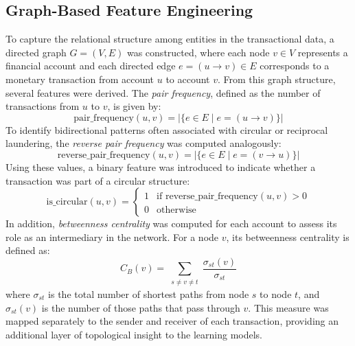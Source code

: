 \documentclass[a4paper]{article}
\begin{document}
\subsection{Graph-Based Feature Engineering}
To capture the relational structure among entities in the transactional data, a directed graph \( G = (V, E) \) was constructed, where each node \( v \in V \) represents a financial account and each directed edge \( e = (u \rightarrow v) \in E \) corresponds to a monetary transaction from account \( u \) to account \( v \).
From this graph structure, several features were derived. The \textit{pair frequency}, defined as the number of transactions from \( u \) to \( v \), is given by:
\begin{equation}
\text{pair\_frequency}(u, v) = |\{ e \in E \mid e = (u \rightarrow v) \}|
\end{equation}
To identify bidirectional patterns often associated with circular or reciprocal laundering, the \textit{reverse pair frequency} was computed analogously:
\begin{equation}
\text{reverse\_pair\_frequency}(u, v) = |\{ e \in E \mid e = (v \rightarrow u) \}|
\end{equation}
Using these values, a binary feature was introduced to indicate whether a transaction was part of a circular structure:
\begin{equation}
\text{is\_circular}(u, v) =
\begin{cases}
1 & \text{if } \text{reverse\_pair\_frequency}(u, v) > 0 \\
0 & \text{otherwise}
\end{cases}
\end{equation}
In addition, \textit{betweenness centrality} was computed for each account to assess its role as an intermediary in the network. For a node \( v \), its betweenness centrality is defined as:
\begin{equation}
C_B(v) = \sum_{\substack{s \neq v \neq t}} \frac{\sigma_{st}(v)}{\sigma_{st}}
\end{equation}
where \( \sigma_{st} \) is the total number of shortest paths from node \( s \) to node \( t \), and \( \sigma_{st}(v) \) is the number of those paths that pass through \( v \). This measure was mapped separately to the sender and receiver of each transaction, providing an additional layer of topological insight to the learning models.
\end{document}
